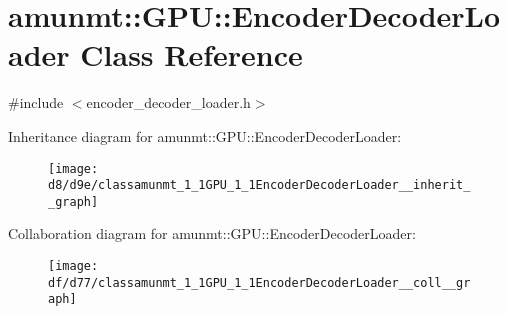 \hypertarget{classamunmt_1_1GPU_1_1EncoderDecoderLoader}{}\section{amunmt\+:\+:G\+PU\+:\+:Encoder\+Decoder\+Loader Class Reference}
\label{classamunmt_1_1GPU_1_1EncoderDecoderLoader}


{\ttfamily \#include $<$encoder\+\_\+decoder\+\_\+loader.\+h$>$}



Inheritance diagram for amunmt\+:\+:G\+PU\+:\+:Encoder\+Decoder\+Loader\+:
\nopagebreak
\begin{figure}[H]
\begin{center}
\leavevmode
\texttt{[image: d8/d9e/classamunmt\_1\_1GPU\_1\_1EncoderDecoderLoader\_\_inherit\_\_graph]}
\end{center}
\end{figure}


Collaboration diagram for amunmt\+:\+:G\+PU\+:\+:Encoder\+Decoder\+Loader\+:
\nopagebreak
\begin{figure}[H]
\begin{center}
\leavevmode
\texttt{[image: df/d77/classamunmt\_1\_1GPU\_1\_1EncoderDecoderLoader\_\_coll\_\_graph]}
\end{center}
\end{figure}
